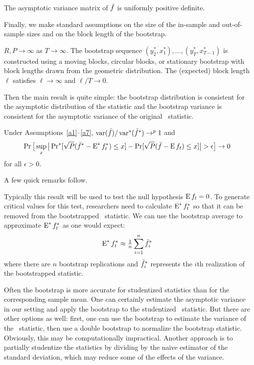 \documentclass[12pt,fleqn]{article}
\begin{document}
\begin{asmp}\label{a6}
  The asymptotic variance matrix of $\bar f$ is uniformly positive definite.
\end{asmp}

Finally, we make standard assumptions on the size of the in-sample and
out-of-sample sizes and on the block length of the bootstrap.

\begin{asmp}\label{a7}
  $R, P \to \infty$ as $T \to \infty$.
  The bootstrap sequence $(y_2^*, x_1^*),\dots,(y_T^*, x_{T-1}^*)$ is
  constructed using a moving blocks, circular blocks, or stationary
  bootstrap with block lengths drawn from the geometric distribution.
  The (expected) block length $\ell$ satisfies $\ell \to \infty$
  and $\ell/T \to 0$.
\end{asmp}

Then the main result is quite simple: the bootstrap distribution is
consistent for the asymptotic distribution of the statistic and the
bootstrap variance is consistent for the asymptotic variance of the
original \oos\ statistic.

\begin{thm}\label{T1}
  Under Assumptions~\ref{a1}--\ref{a7}, $\operatorname{var}(\bar f)/\operatorname{var}^*(\bar f^*)
  \to^p 1$ and
  \begin{equation}\label{eq:15}
    \operatorname{Pr}\big[\sup_x \big\lvert \operatorname{Pr}^*[\sqrt{P} (\bar f^* - \operatorname{E}^* f_t^*) \leq x]
    - \operatorname{Pr}[\sqrt{P}( \bar{f} - \operatorname{E} f_t) \leq x] \big\rvert > \epsilon\big] \to 0
  \end{equation}
  for all $\epsilon > 0$.
\end{thm}

A few quick remarks follow.
\begin{rem}
  Typically this result will be used to test the null hypothesis $\operatorname{E}
  f_t = 0$. To generate critical values for this test, researchers
  need to calculate $\operatorname{E}^* f_t^*$ so that it can be removed from the
  bootstrapped \oos\ statistic. We can use the bootstrap average to
  approximate $\operatorname{E}^* f_t^*$ as one would expect:
  \begin{equation*}
    \operatorname{E}^* f_t^* \approx \tfrac{1}{n} \sum_{i=1}^n \bar f_i^*
  \end{equation*}
  where there are $n$ bootstrap replications and $\bar f_i^*$ represents
  the $i$th realization of the bootstrapped statistic.
\end{rem}

\begin{rem}
  Often the bootstrap is more accurate for studentized statistics than
  for the corresponding sample mean. One can certainly estimate the
  asymptotic variance in our setting and apply the bootstrap to the
  studentized \oos\ statistic. But there are other options as well:
  first, one can use the bootstrap to estimate the variance of the
  \oos\ statistic, then use a double bootstrap to normalize the
  bootstrap statistic. Obviously, this may be computationally
  impractical. Another approach is to partially studentize the
  statistics by dividing by the naive estimator of the standard
  deviation, which may reduce some of the effects of the variance.
\end{rem}
\end{document}

